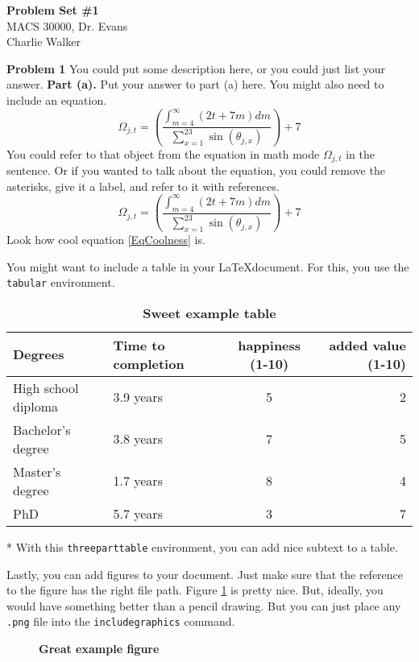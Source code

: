 \documentclass[letterpaper,12pt]{article}
\theoremstyle{definition}
\begin{document}
\begin{flushleft}
  \textbf{\large{Problem Set \#1}} \\
  MACS 30000, Dr. Evans \\
  Charlie Walker
\end{flushleft}

\vspace{5mm}

\noindent\textbf{Problem 1}
You could put some description here, or you could just list your answer.
\textbf{Part (a).} Put your answer to part (a) here. You might also need to include an equation.
\begin{equation*}
  \Omega_{j,t} = \left(\frac{\int_{m=4}^\infty(2t + 7m)dm}{\sum_{x=1}^23\sin(\theta_{j,x})}\right) + 7
\end{equation*}
You could refer to that object from the equation in math mode $\Omega_{j,t}$ in the sentence. Or if you wanted to talk about the equation, you could remove the asterisks, give it a label, and refer to it with references.
\begin{equation}\label{EqCoolness}
  \Omega_{j,t} = \left(\frac{\int_{m=4}^\infty(2t + 7m)dm}{\sum_{x=1}^23\sin(\theta_{j,x})}\right) + 7
\end{equation}
Look how cool equation \eqref{EqCoolness} is.

You might want to include a table in your \LaTeX document. For this, you use the \texttt{tabular} environment.
\begin{table}[htbp] \centering \captionsetup{width=6.0in}
\caption{\label{TabExample}\textbf{Sweet example table}}
  \begin{threeparttable}
  \begin{tabular}{>{\small}l |>{\small}l >{\small}c |>{\small}r}
    \hline\hline
    Degrees & Time to completion & happiness (1-10) & added value (1-10) \\
    \hline
    High school diploma & 3.9 years & 5 & 2 \\
    Bachelor's degree   & 3.8 years & 7 & 5 \\
    Master's degree     & 1.7 years & 8 & 4 \\
    PhD                 & 5.7 years & 3 & 7 \\
    \hline\hline
  \end{tabular}
  \begin{tablenotes}
    \scriptsize{\item[*]With this \texttt{threeparttable} environment, you can add nice subtext to a table.}
  \end{tablenotes}
  \end{threeparttable}
\end{table}
Lastly, you can add figures to your document. Just make sure that the reference to the figure has the right file path. Figure \ref{FigExample} is pretty nice. But, ideally, you would have something better than a pencil drawing. But you can just place any \texttt{.png} file into the \texttt{includegraphics} command.
\begin{figure}[htb]\centering\captionsetup{width=4.0in}
  \caption{\textbf{Great example figure}}\label{FigExample}
\end{figure}
\end{document}
